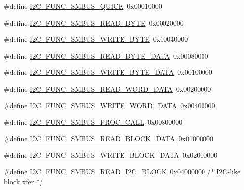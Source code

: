 \begin{DoxyCompactItemize}
\item 
\#define \hyperlink{smbus-cffi-0_83_82_2include_2linux_2i2c-dev_8h_a4cf424f52753c3afe4ee9713c96358a2}{I2\+C\+\_\+\+F\+U\+N\+C\+\_\+\+S\+M\+B\+U\+S\+\_\+\+Q\+U\+I\+C\+K}~0x00010000
\item 
\#define \hyperlink{smbus-cffi-0_83_82_2include_2linux_2i2c-dev_8h_a2aea3a65daa2b1734e85d5c63b9e9672}{I2\+C\+\_\+\+F\+U\+N\+C\+\_\+\+S\+M\+B\+U\+S\+\_\+\+R\+E\+A\+D\+\_\+\+B\+Y\+T\+E}~0x00020000
\item 
\#define \hyperlink{smbus-cffi-0_83_82_2include_2linux_2i2c-dev_8h_a0a0e43b21d3085e3a00300f41ccf156d}{I2\+C\+\_\+\+F\+U\+N\+C\+\_\+\+S\+M\+B\+U\+S\+\_\+\+W\+R\+I\+T\+E\+\_\+\+B\+Y\+T\+E}~0x00040000
\item 
\#define \hyperlink{smbus-cffi-0_83_82_2include_2linux_2i2c-dev_8h_a5645b268c2303289fdf043c3a035bf8d}{I2\+C\+\_\+\+F\+U\+N\+C\+\_\+\+S\+M\+B\+U\+S\+\_\+\+R\+E\+A\+D\+\_\+\+B\+Y\+T\+E\+\_\+\+D\+A\+T\+A}~0x00080000
\item 
\#define \hyperlink{smbus-cffi-0_83_82_2include_2linux_2i2c-dev_8h_ac4186861a5c7f01d45e1f4ecba20334c}{I2\+C\+\_\+\+F\+U\+N\+C\+\_\+\+S\+M\+B\+U\+S\+\_\+\+W\+R\+I\+T\+E\+\_\+\+B\+Y\+T\+E\+\_\+\+D\+A\+T\+A}~0x00100000
\item 
\#define \hyperlink{smbus-cffi-0_83_82_2include_2linux_2i2c-dev_8h_a1e313c48fbaba109e4b42b615c806459}{I2\+C\+\_\+\+F\+U\+N\+C\+\_\+\+S\+M\+B\+U\+S\+\_\+\+R\+E\+A\+D\+\_\+\+W\+O\+R\+D\+\_\+\+D\+A\+T\+A}~0x00200000
\item 
\#define \hyperlink{smbus-cffi-0_83_82_2include_2linux_2i2c-dev_8h_a485634a989b0ace55940b8235785fcc5}{I2\+C\+\_\+\+F\+U\+N\+C\+\_\+\+S\+M\+B\+U\+S\+\_\+\+W\+R\+I\+T\+E\+\_\+\+W\+O\+R\+D\+\_\+\+D\+A\+T\+A}~0x00400000
\item 
\#define \hyperlink{smbus-cffi-0_83_82_2include_2linux_2i2c-dev_8h_a86389b833643e6b1a050f6d4a7027873}{I2\+C\+\_\+\+F\+U\+N\+C\+\_\+\+S\+M\+B\+U\+S\+\_\+\+P\+R\+O\+C\+\_\+\+C\+A\+L\+L}~0x00800000
\item 
\#define \hyperlink{smbus-cffi-0_83_82_2include_2linux_2i2c-dev_8h_a8a64d1f3b43e584549645386089fafe4}{I2\+C\+\_\+\+F\+U\+N\+C\+\_\+\+S\+M\+B\+U\+S\+\_\+\+R\+E\+A\+D\+\_\+\+B\+L\+O\+C\+K\+\_\+\+D\+A\+T\+A}~0x01000000
\item 
\#define \hyperlink{smbus-cffi-0_83_82_2include_2linux_2i2c-dev_8h_a1f3f845fc6c212f6d54848cc71e752ab}{I2\+C\+\_\+\+F\+U\+N\+C\+\_\+\+S\+M\+B\+U\+S\+\_\+\+W\+R\+I\+T\+E\+\_\+\+B\+L\+O\+C\+K\+\_\+\+D\+A\+T\+A}~0x02000000
\item 
\#define \hyperlink{smbus-cffi-0_83_82_2include_2linux_2i2c-dev_8h_a1e2efae197b3bcf4adb79b45065da621}{I2\+C\+\_\+\+F\+U\+N\+C\+\_\+\+S\+M\+B\+U\+S\+\_\+\+R\+E\+A\+D\+\_\+\+I2\+C\+\_\+\+B\+L\+O\+C\+K}~0x04000000 /$\ast$ I2\+C-\/like block xfer  $\ast$/

\end{DoxyCompactItemize}
